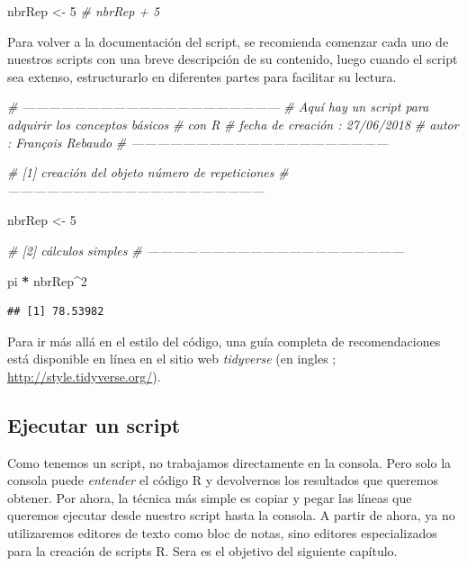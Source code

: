 \documentclass[]{book}
\makeatletter
\newenvironment{Shaded}{\begin{snugshade}}{\end{snugshade}}
\newcommand{\DecValTok}[1]{\textcolor[rgb]{0.00,0.00,0.81}{#1}}
\newcommand{\StringTok}[1]{\textcolor[rgb]{0.31,0.60,0.02}{#1}}
\newcommand{\CommentTok}[1]{\textcolor[rgb]{0.56,0.35,0.01}{\textit{#1}}}
\newcommand{\OperatorTok}[1]{\textcolor[rgb]{0.81,0.36,0.00}{\textbf{#1}}}
\newcommand{\NormalTok}[1]{#1}
\newenvironment{kframe}{%
\medskip{}
\setlength{\fboxsep}{.8em}
 \def\at@end@of@kframe{}%
 \ifinner\ifhmode%
  \def\at@end@of@kframe{\end{minipage}}%
  \begin{minipage}{\columnwidth}%
 \fi\fi%
 \def\FrameCommand##1{\hskip\@totalleftmargin \hskip-\fboxsep
 \colorbox{shadecolor}{##1}\hskip-\fboxsep
     \hskip-\linewidth \hskip-\@totalleftmargin \hskip\columnwidth}%
 \MakeFramed {\advance\hsize-\width
   \@totalleftmargin\z@ \linewidth\hsize
   \@setminipage}}%
 {\par\unskip\endMakeFramed%
 \at@end@of@kframe}
\newenvironment{rmdblock}[1]
  {
  \begin{itemize}
  \renewcommand{\labelitemi}{
    \raisebox{-.7\height}[0pt][0pt]{
      {\setkeys{Gin}{width=3em,keepaspectratio}\texttt{[image: myIcons/\#1]}} %
    }
  }
  \setlength{\fboxsep}{1em}
  \begin{kframe}
  \item
  }
  {
  \end{kframe}
  \end{itemize}
  }
\newenvironment{rmdstyle}     %
  {\begin{rmdblock}{style}}   %
  {\end{rmdblock}}            %
\makeatother
\begin{document}
\begin{Shaded}
\begin{Highlighting}[]
\NormalTok{nbrRep <-}\StringTok{ }\DecValTok{5}
\CommentTok{# nbrRep + 5}
\end{Highlighting}
\end{Shaded}

Para volver a la documentación del script, se recomienda comenzar cada
uno de nuestros scripts con una breve descripción de su contenido, luego
cuando el script sea extenso, estructurarlo en diferentes partes para
facilitar su lectura.

\begin{Shaded}
\begin{Highlighting}[]
\CommentTok{# ------------------------------------------------------------}
\CommentTok{# Aquí hay un script para adquirir los conceptos básicos}
\CommentTok{# con R}
\CommentTok{# fecha de creación : 27/06/2018}
\CommentTok{# autor : François Rebaudo}
\CommentTok{# ------------------------------------------------------------}

\CommentTok{# [1] creación del objeto número de repeticiones}
\CommentTok{# ------------------------------------------------------------}

\NormalTok{nbrRep <-}\StringTok{ }\DecValTok{5}

\CommentTok{# [2] cálculos simples}
\CommentTok{# ------------------------------------------------------------}

\NormalTok{pi }\OperatorTok{*}\StringTok{ }\NormalTok{nbrRep}\OperatorTok{^}\DecValTok{2}
\end{Highlighting}
\end{Shaded}

\begin{verbatim}
## [1] 78.53982
\end{verbatim}

\begin{rmdstyle}
Para ir más allá en el estilo del código, una guía completa de
recomendaciones está disponible en línea en el sitio web
\emph{tidyverse} (en ingles ; \url{http://style.tidyverse.org/}).
\end{rmdstyle}

\subsection{Ejecutar un script}\label{ejecutar-un-script}

Como tenemos un script, no trabajamos directamente en la consola. Pero
solo la consola puede \emph{entender} el código R y devolvernos los
resultados que queremos obtener. Por ahora, la técnica más simple es
copiar y pegar las líneas que queremos ejecutar desde nuestro script
hasta la consola. A partir de ahora, ya no utilizaremos editores de
texto como bloc de notas, sino editores especializados para la creación
de scripts R. Sera es el objetivo del siguiente capítulo.
\end{document}
